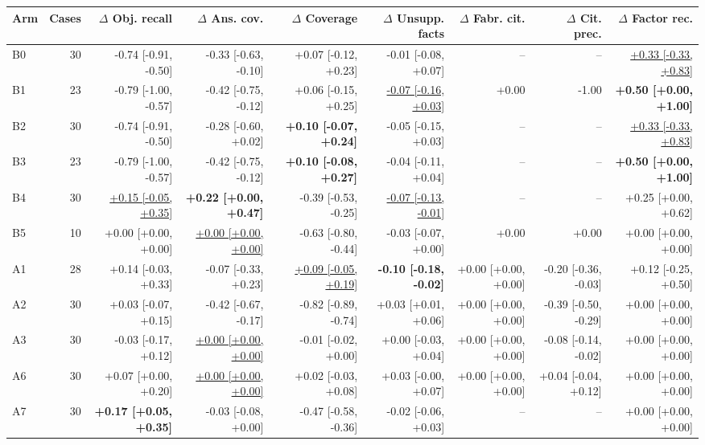\begin{table}[t]
\centering\footnotesize
\begin{adjustbox}{max width=\textwidth}
\begin{tabular}{@{}lrrrrrrrr@{}}
\toprule
Arm & Cases & $\Delta$ Obj. recall & $\Delta$ Ans. cov. & $\Delta$ Coverage & $\Delta$ Unsupp. facts & $\Delta$ Fabr. cit. & $\Delta$ Cit. prec. & $\Delta$ Factor rec. \\
\midrule
B0 & 30 & -0.74 [-0.91, -0.50] & -0.33 [-0.63, -0.10] & +0.07 [-0.12, +0.23] & -0.01 [-0.08, +0.07] & -- & -- & \underline{+0.33 [-0.33, +0.83]} \\
B1 & 23 & -0.79 [-1.00, -0.57] & -0.42 [-0.75, -0.12] & +0.06 [-0.15, +0.25] & \underline{-0.07 [-0.16, +0.03]} & +0.00 & -1.00 & \textbf{+0.50 [+0.00, +1.00]} \\
B2 & 30 & -0.74 [-0.91, -0.50] & -0.28 [-0.60, +0.02] & \textbf{+0.10 [-0.07, +0.24]} & -0.05 [-0.15, +0.03] & -- & -- & \underline{+0.33 [-0.33, +0.83]} \\
B3 & 23 & -0.79 [-1.00, -0.57] & -0.42 [-0.75, -0.12] & \textbf{+0.10 [-0.08, +0.27]} & -0.04 [-0.11, +0.04] & -- & -- & \textbf{+0.50 [+0.00, +1.00]} \\
B4 & 30 & \underline{+0.15 [-0.05, +0.35]} & \textbf{+0.22 [+0.00, +0.47]} & -0.39 [-0.53, -0.25] & \underline{-0.07 [-0.13, -0.01]} & -- & -- & +0.25 [+0.00, +0.62] \\
B5 & 10 & +0.00 [+0.00, +0.00] & \underline{+0.00 [+0.00, +0.00]} & -0.63 [-0.80, -0.44] & -0.03 [-0.07, +0.00] & +0.00 & +0.00 & +0.00 [+0.00, +0.00] \\
A1 & 28 & +0.14 [-0.03, +0.33] & -0.07 [-0.33, +0.23] & \underline{+0.09 [-0.05, +0.19]} & \textbf{-0.10 [-0.18, -0.02]} & +0.00 [+0.00, +0.00] & -0.20 [-0.36, -0.03] & +0.12 [-0.25, +0.50] \\
A2 & 30 & +0.03 [-0.07, +0.15] & -0.42 [-0.67, -0.17] & -0.82 [-0.89, -0.74] & +0.03 [+0.01, +0.06] & +0.00 [+0.00, +0.00] & -0.39 [-0.50, -0.29] & +0.00 [+0.00, +0.00] \\
A3 & 30 & -0.03 [-0.17, +0.12] & \underline{+0.00 [+0.00, +0.00]} & -0.01 [-0.02, +0.00] & +0.00 [-0.03, +0.04] & +0.00 [+0.00, +0.00] & -0.08 [-0.14, -0.02] & +0.00 [+0.00, +0.00] \\
A6 & 30 & +0.07 [+0.00, +0.20] & \underline{+0.00 [+0.00, +0.00]} & +0.02 [-0.03, +0.08] & +0.03 [-0.00, +0.07] & +0.00 [+0.00, +0.00] & +0.04 [-0.04, +0.12] & +0.00 [+0.00, +0.00] \\
A7 & 30 & \textbf{+0.17 [+0.05, +0.35]} & -0.03 [-0.08, +0.00] & -0.47 [-0.58, -0.36] & -0.02 [-0.06, +0.03] & -- & -- & +0.00 [+0.00, +0.00] \\

\end{tabular}
\end{adjustbox}
\end{table}
